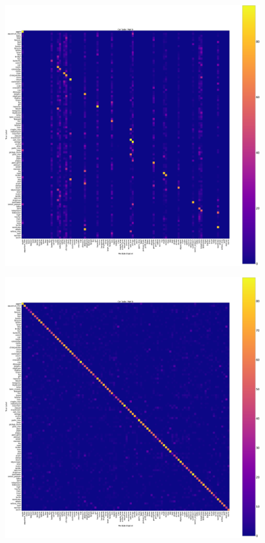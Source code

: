 \documentclass{article}
\begin{document}
\begin{figure}[h]
\centering
\begin{minipage}{.5\textwidth}
  \centering
  \includegraphics[width=.6\linewidth]{assets/gumbel_softmax_cm.png}
  \newline
  \noindent
  \label{fig:test1}
\end{minipage}%
\begin{minipage}{.5\textwidth}
  \centering
  \includegraphics[width=.6\linewidth]{assets/log_gumbel_softmax_cm.png}
  \newline
  \noindent
  \label{fig:test2}
\end{minipage}
\end{figure}
\end{document}
